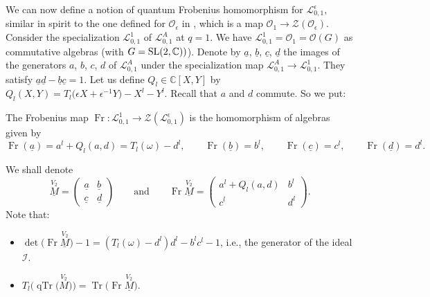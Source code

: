 \documentclass[pdftex]{sigma}%
\numberwithin{equation}{section}
\numberwithin{figure}{section}
\newcommand{\mc}{\mathbb{C}}
\newcommand{\Ll}{{\mathcal L}}
\newcommand{\ra}{\rightarrow}
\begin{document}
We can now define a notion of quantum Frobenius homomorphism for $\Ll_{0,1}^\epsilon,$ similar in spirit to the one defined for $\mathcal{O}_\epsilon$ in \cite{PW}, which is a map $\mathcal{O}_1\ra \mathcal{Z}(\mathcal{O}_\epsilon)$. Consider the specialization $\Ll_{0,1}^1$ of $\Ll_{0,1}^A$ at $q=1$. We have $\Ll_{0,1}^1=\mathcal{O}_1=\mathcal{O}(G)$ as commutative algebras (with $G={\rm SL}(2,\mc))$). Denote by $\underline{a}$, $\underline{b}$, $\underline{c}$, $\underline{d}$ the images of the generators $a$, $b$, $c$, $d$ of $\Ll_{0,1}^A$ under the specialization map $\Ll_{0,1}^A\ra \Ll_{0,1}^1$. They satisfy $\underline{a}\underline{d}-\underline{b}\underline{c}=1.$
Let us define $Q_l\in {\mathbb C}[X,Y]$ by $Q_l(X,Y)=T_l\big(\epsilon X+\epsilon^{-1}Y\big)-X^l-Y^l$.
Recall that $a$ and $d$ commute. So we put:
\begin{defi} \label{defFr1}
The Frobenius map $\operatorname{Fr}\colon \Ll_{0,1}^1\rightarrow \mathcal{Z}(\Ll_{0,1}^\epsilon)$ is the homomorphism of algebras given by
\[
\operatorname{Fr}(\underline{a})=a^l+Q_l(a,d)=T_l(\omega)-d^l, \qquad
\operatorname{Fr}(\underline{b})=b^l, \qquad
\operatorname{Fr}(\underline{c})=c^l,\qquad
\operatorname{Fr}(\underline{d})=d^l.
\]
\end{defi}
We shall denote
\begin{equation*}
\underline{\stackrel{V_2}{M}}=\begin{pmatrix} \underline{a} & \underline{b}\\\underline{c}&\underline{d}\end{pmatrix}\qquad \text{and}\qquad
\operatorname{Fr}\underline{\stackrel{V_2}{M}}=\begin{pmatrix} a^l+Q_l(a,d)& b^l\\c^l&d^l
\end{pmatrix}\!.
\end{equation*}
Note that:
\begin{itemize}\itemsep=0pt
\item
$\det\big(\!\operatorname{Fr}\underline{\stackrel{V_2}{M}}\big)-1 = (T_l(\omega) - d^l)d^l - b^lc^l - 1$, i.e., the generator of the ideal $\mathcal{I}$.

\item
$T_l\big(\!\operatorname{qTr}\big(\!\stackrel{V_2}{M}\big)\big)
=\operatorname{Tr}\big(\!\operatorname{Fr}\underline{\stackrel{V_2}{M}}\big)$.
\end{itemize}
\end{document}
